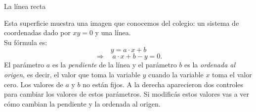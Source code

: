 \documentclass[es]{../../common/SurferDesc}%
\begin{document}
\footnotesize
%
 
\begin{surferPage}
  \begin{surferTitle}La l\'inea recta\end{surferTitle}
   \begin{surferText}
   
Esta superficie muestra una imagen que conocemos del colegio: un sistema de coordenadas dado por $xy=0$  y una l\'inea.\\
Su f\'ormula es:
\[y=a\cdot x + b\]
\[ \Rightarrow \quad a\cdot x +b -y=0.\]
El par\'ametro $a$ es la {\it pendiente} de la l\'inea y el par\'ametro $b$ es la {\it ordenada al origen}, es decir, el valor que toma la variable $y$ cuando la variable $x$ toma el valor cero.
\newline \newline
Los valores de $a$ y $b$ no est\'an fijos. A la derecha aparecieron dos controles para cambiar los valores de estos par\'ametros. Si modific\'as estos valores vas a ver c\'omo cambian la pendiente y la ordenada al origen.

     \end{surferText}
\end{surferPage}
\end{document}
